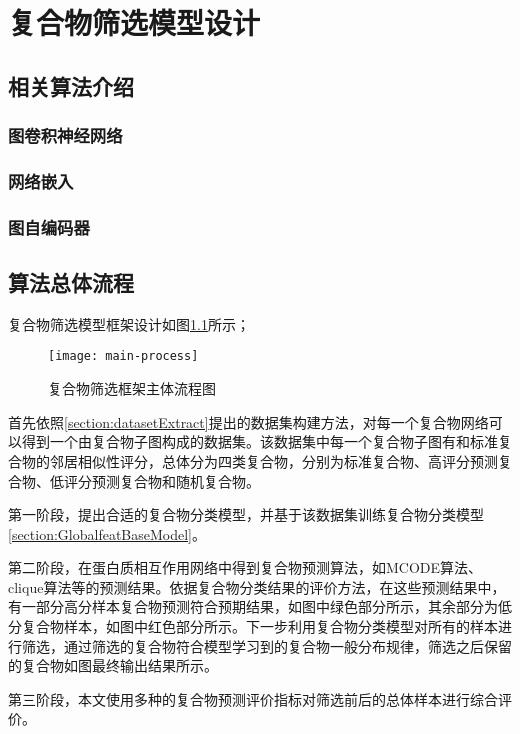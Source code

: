 \chapter{复合物筛选模型设计}
\label{chapter:gcnfilter}

\section{相关算法介绍}
\label{section:arithmetic}
\subsection{图卷积神经网络}
\label{subsection:GCN}
\subsection{网络嵌入}
\label{subsection:nodeEmbedding}
\subsection{图自编码器}
\label{subsection:GAE}
\section{算法总体流程}
\label{section:progress}

复合物筛选模型框架设计如图\ref{fig:main-process}所示；

\begin{figure}[htbp]
    \centering
    \texttt{[image: main-process]}
    \caption{复合物筛选框架主体流程图}
    \label{fig:main-process}
\end{figure}

首先依照\ref{section:datasetExtract}提出的数据集构建方法，对每一个复合物网络可以得到一个由复合物子图构成的数据集。该数据集中每一个复合物子图有和标准复合物的邻居相似性评分，总体分为四类复合物，分别为标准复合物、高评分预测复合物、低评分预测复合物和随机复合物。

第一阶段，提出合适的复合物分类模型，并基于该数据集训练复合物分类模型\ref{section:GlobalfeatBaseModel}。

第二阶段，在蛋白质相互作用网络中得到复合物预测算法，如MCODE算法、clique算法等的预测结果。依据复合物分类结果的评价方法，在这些预测结果中，有一部分高分样本复合物预测符合预期结果，如图中绿色部分所示，其余部分为低分复合物样本，如图中红色部分所示。下一步利用复合物分类模型对所有的样本进行筛选，通过筛选的复合物符合模型学习到的复合物一般分布规律，筛选之后保留的复合物如图最终输出结果所示。

第三阶段，本文使用多种的复合物预测评价指标对筛选前后的总体样本进行综合评价。



